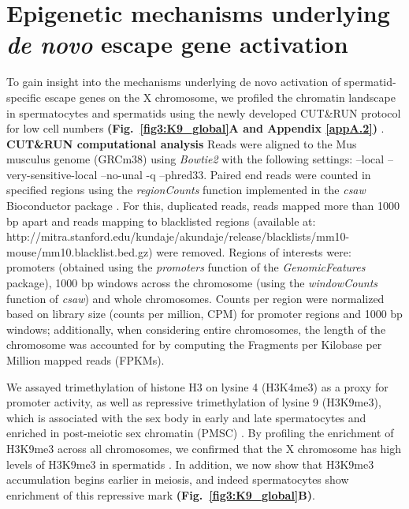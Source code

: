 \newpage

\section{Epigenetic mechanisms underlying \emph{de novo} escape gene activation}

To gain insight into the mechanisms underlying de novo activation of spermatid-specific escape genes on the X chromosome, we profiled the chromatin landscape in spermatocytes and spermatids using the newly developed CUT\&{}RUN protocol for low cell numbers \textbf{(Fig.~\ref{fig3:K9_global}A and Appendix \ref{appA.2})} \citep{Skene2018}. \\

\textbf{CUT\&{}RUN computational analysis}
Reads were aligned to the Mus musculus genome (GRCm38) using \textit{Bowtie2} with the following settings: --local --very-sensitive-local --no-unal -q --phred33. Paired end reads were counted in specified regions using the \textit{regionCounts} function implemented in the \textit{csaw} Bioconductor package \citep{Lun2015}. For this, duplicated reads, reads mapped more than 1000 bp apart and reads mapping to blacklisted regions (available at: http://mitra.stanford.edu/kundaje/akundaje/release/blacklists/mm10-mouse/mm10.blacklist.bed.gz) were removed. Regions of interests were: promoters (obtained using the \textit{promoters} function of the \textit{GenomicFeatures} package), 1000 bp windows across the chromosome (using the \textit{windowCounts} function of \textit{csaw}) and whole chromosomes. Counts per region were normalized based on library size (counts per million, CPM) for promoter regions and 1000 bp windows; additionally, when considering entire chromosomes, the length of the chromosome was accounted for by computing the Fragments per Kilobase per Million mapped reads (FPKMs). 

We assayed trimethylation of histone H3 on lysine 4 (H3K4me3) as a proxy for promoter activity, as well as repressive trimethylation of lysine 9 (H3K9me3), which is associated with the sex body in early and late spermatocytes and enriched in post-meiotic sex chromatin (PMSC) \citep{Greaves2006, Tachibana2007}. By profiling the enrichment of H3K9me3 across all chromosomes, we confirmed that the X chromosome has high levels of H3K9me3 in spermatids \citep{Moretti2016}. In addition, we now show that H3K9me3 accumulation begins earlier in meiosis, and indeed spermatocytes show enrichment of this repressive mark \textbf{(Fig.~\ref{fig3:K9_global}B)}. 

